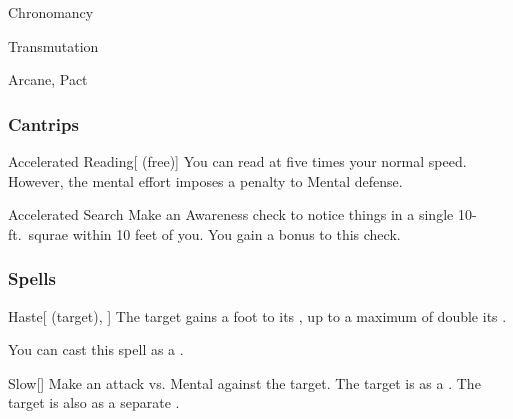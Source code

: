 \newpage
\begin{spellsection}{Chronomancy}

\begin{spellheader}
\end{spellheader}


 Transmutation

 Arcane, Pact

\subsubsection{Cantrips}


\begin{freeability}{Accelerated Reading}[ (free)]
You can read at five times your normal speed.
However, the mental effort imposes a  penalty to Mental defense.
\end{freeability}


\begin{freeability}{Accelerated Search}
Make an Awareness check to notice things in a single 10-ft.\ squrae within 10 feet of you.
You gain a  bonus to this check.
\end{freeability}

\end{spellsection}


\subsubsection{Spells}


\lowercase{\hypertarget{spell:Haste}{}}\label{spell:Haste}
\begin{attuneability}[\nth{1}]{\hypertarget{spell:Haste}{Haste}}[ (target), ]
The target gains a  foot  to its , up to a maximum of double its .

You can cast this spell as a .
\end{attuneability}
\vspace{0.25em}



\lowercase{\hypertarget{spell:Slow}{}}\label{spell:Slow}
\begin{freeability}[\nth{1}]{\hypertarget{spell:Slow}{Slow}}[]
Make an attack vs. Mental against the target.
\hit The target is  as a .
\crit The target is also  as a separate .
\end{freeability}
\vspace{0.25em}



